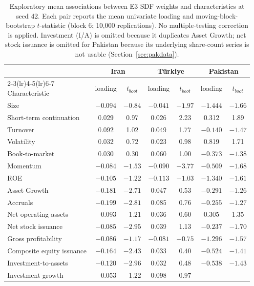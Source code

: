 \documentclass[12pt]{article}
\begin{document}
\begin{table}[htbp]
\centering
\caption{Exploratory mean associations between E3 SDF weights and characteristics at seed 42. Each pair reports the mean univariate loading and moving-block-bootstrap $t$-statistic (block 6; 10,000 replications). No multiple-testing correction is applied. Investment (I/A) is omitted because it duplicates Asset Growth; net stock issuance is omitted for Pakistan because its underlying share-count series is not usable (Section~\ref{sec:pakdata}).}
\label{tab:loadings}
\scriptsize
\setlength{\tabcolsep}{3.5pt}
\begin{tabular}{l cc cc cc}
\toprule
 & \multicolumn{2}{c}{Iran} & \multicolumn{2}{c}{T\"urkiye} & \multicolumn{2}{c}{Pakistan} \\
\cmidrule(lr){2-3}\cmidrule(lr){4-5}\cmidrule(lr){6-7}
Characteristic & loading & $t_{boot}$ & loading & $t_{boot}$ & loading & $t_{boot}$ \\
\midrule
Size & $-0.094$ & $-0.84$ & $-0.041$ & $-1.97$ & $-1.444$ & $-1.66$ \\
Short-term continuation & 0.029 & 0.97 & 0.026 & 2.23 & 0.312 & 1.89 \\
Turnover & 0.092 & 1.02 & 0.049 & 1.77 & $-0.140$ & $-1.47$ \\
Volatility & 0.032 & 0.72 & 0.023 & 0.98 & 0.819 & 1.71 \\
Book-to-market & 0.030 & 0.30 & 0.060 & 1.00 & $-0.373$ & $-1.38$ \\
Momentum & $-0.084$ & $-1.53$ & $-0.090$ & $-3.77$ & $-0.509$ & $-1.68$ \\
ROE & $-0.105$ & $-1.22$ & $-0.113$ & $-1.03$ & $-1.340$ & $-1.61$ \\
Asset Growth & $-0.181$ & $-2.71$ & 0.047 & 0.53 & $-0.291$ & $-1.26$ \\
Accruals & $-0.199$ & $-2.81$ & 0.085 & 0.76 & $-0.255$ & $-1.27$ \\
Net operating assets & $-0.093$ & $-1.21$ & 0.036 & 0.60 & 0.305 & 1.35 \\
Net stock issuance & $-0.085$ & $-2.95$ & 0.039 & 1.13 & $-0.237$ & $-1.70$ \\
Gross profitability & $-0.086$ & $-1.17$ & $-0.081$ & $-0.75$ & $-1.296$ & $-1.57$ \\
Composite equity issuance & $-0.164$ & $-2.43$ & 0.033 & 0.40 & $-0.524$ & $-1.41$ \\
Investment-to-assets & $-0.120$ & $-2.96$ & 0.032 & 0.48 & $-0.538$ & $-1.43$ \\
Investment growth & $-0.053$ & $-1.22$ & 0.098 & 0.97 & --- & --- \\

\end{tabular}
\end{table}
\end{document}
